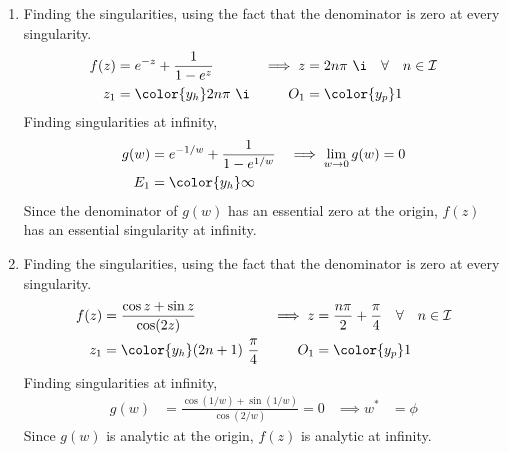 \begin{enumerate}
    \item Finding the singularities, using the fact that the denominator is zero at
          every singularity.
          \begin{align}
              f(z)       & = e^{-z} + \frac{1}{1 - e^z}                      &
              \implies z & = 2n\pi\ \i \quad \forall \quad n \in \mathcal{I}   \\
              z_1        & = \color{y_h} 2n\pi\ \i                           &
              O_1        & = \color{y_p} 1
          \end{align}
          Finding singularities at infinity,
          \begin{align}
              g(w)                         & = e^{-1/w} + \frac{1}{1 - e^{1/w}} &
              \implies \lim_{w \to 0} g(w) & =  0                                 \\
              E_1                          & = \color{y_h} \infty
          \end{align}
          Since the denominator of $ g(w) $ has an essential zero at the origin,
          $ f(z) $ has an essential singularity at infinity.

    \item Finding the singularities, using the fact that the denominator is zero at
          every singularity.
          \begin{align}
              f(z)       & = \frac{\cos z + \sin z}{\cos(2z)}    &
              \implies z & = \frac{n\pi}{2} + \frac{\pi}{4}
              \quad \forall \quad n \in \mathcal{I}                \\
              z_1        & = \color{y_h} (2n + 1)\ \frac{\pi}{4} &
              O_1        & = \color{y_p} 1
          \end{align}
          Finding singularities at infinity,
          \begin{align}
              g(w)         & = \frac{\cos(1/w) + \sin(1/w)}{\cos(2/w)} = 0 &
              \implies w^* & = \phi
          \end{align}
          Since $ g(w) $ is analytic at the origin,
          $ f(z) $ is analytic at infinity.


\end{enumerate}
